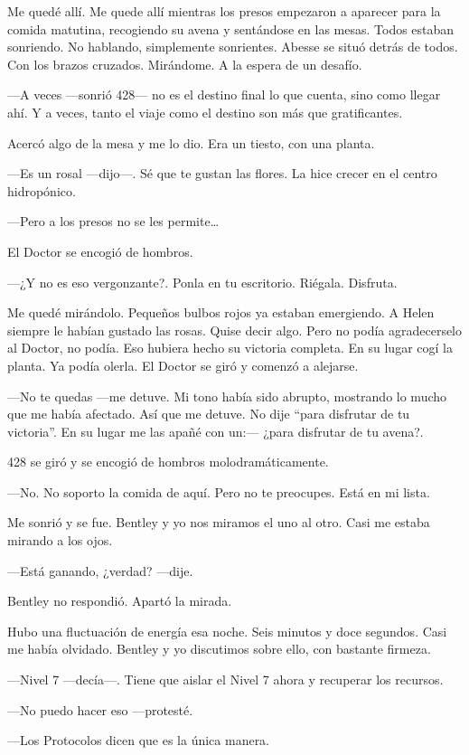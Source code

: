 Me quedé allí. Me quede allí mientras los presos empezaron a aparecer
para la comida matutina, recogiendo su avena y sentándose en las mesas.
Todos estaban sonriendo. No hablando, simplemente sonrientes. Abesse se
situó detrás de todos. Con los brazos cruzados. Mirándome. A la espera
de un desafío.

---A veces ---sonrió 428--- no es el destino final lo que cuenta, sino
como llegar ahí. Y a veces, tanto el viaje como el destino son más que
gratificantes.

Acercó algo de la mesa y me lo dio. Era un tiesto, con una planta.

---Es un rosal ---dijo---. Sé que te gustan las flores. La hice crecer
en el centro hidropónico.

---Pero a los presos no se les permite\ldots{}

El Doctor se encogió de hombros.

---¿Y no es eso vergonzante?. Ponla en tu escritorio. Riégala. Disfruta.

Me quedé mirándolo. Pequeños bulbos rojos ya estaban emergiendo. A Helen
siempre le habían gustado las rosas. Quise decir algo. Pero no podía
agradecerselo al Doctor, no podía. Eso hubiera hecho su victoria
completa. En su lugar cogí la planta. Ya podía olerla. El Doctor se giró
y comenzó a alejarse.

---No te quedas ---me detuve. Mi tono había sido abrupto, mostrando lo
mucho que me había afectado. Así que me detuve. No dije ``para disfrutar
de tu victoria''. En su lugar me las apañé con un:--- ¿para disfrutar de
tu avena?.

428 se giró y se encogió de hombros molodramáticamente.

---No. No soporto la comida de aquí. Pero no te preocupes. Está en mi
lista.

Me sonrió y se fue. Bentley y yo nos miramos el uno al otro. Casi me
estaba mirando a los ojos.

---Está ganando, ¿verdad? ---dije.

Bentley no respondió. Apartó la mirada.

Hubo una fluctuación de energía esa noche. Seis minutos y doce segundos.
Casi me había olvidado. Bentley y yo discutimos sobre ello, con bastante
firmeza.

---Nivel 7 ---decía---. Tiene que aislar el Nivel 7 ahora y recuperar
los recursos.

---No puedo hacer eso ---protesté.

---Los Protocolos dicen que es la única manera.

